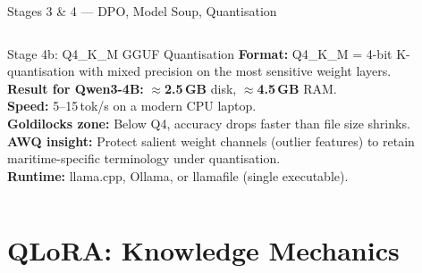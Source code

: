 \documentclass[aspectratio=169,11pt]{beamer}
\begin{document}
\begin{frame}[shrink=18]{Stages 3 \& 4 --- DPO, Model Soup, Quantisation}
\begin{columns}[T]
\vspace{5pt}
\begin{block}{Stage 4b: Q4\_K\_M GGUF Quantisation}
  \scriptsize\RaggedRight
  \textbf{Format:} Q4\_K\_M = 4-bit K-quantisation with mixed precision
  on the most sensitive weight layers.\\[2pt]
  \textbf{Result for Qwen3-4B:} $\approx$\textbf{2.5\,GB} disk, $\approx$\textbf{4.5\,GB} RAM.\\[2pt]
  \textbf{Speed:} 5--15\,tok/s on a modern CPU laptop.\\[2pt]
  \textbf{Goldilocks zone:} Below Q4, accuracy drops faster than file size shrinks.\\[2pt]
  \textbf{AWQ insight:} Protect salient weight channels (outlier features)
  to retain maritime-specific terminology under quantisation.\\[2pt]
  \textbf{Runtime:} llama.cpp, Ollama, or llamafile (single executable).
\end{block}

\end{columns}
\end{frame}

\section{QLoRA: Knowledge Mechanics}
\end{document}
